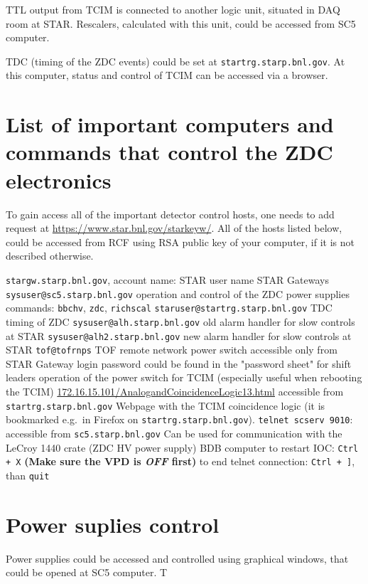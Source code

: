 TTL output from TCIM is connected to another logic unit, situated in DAQ room at STAR. Rescalers, calculated with this unit, could be accessed from SC5 computer.

TDC (timing of the ZDC events) could be set at \texttt{startrg.starp.bnl.gov}. At this computer, status and control of TCIM can be accessed via a browser.

\section{List of important computers and commands that control the ZDC electronics}

To gain access all of the important detector control hosts, one needs to add request at \url{https://www.star.bnl.gov/starkeyw/}. All of the hosts listed below, could be accessed from RCF using RSA public key of your computer, if it is not described otherwise.
\begin{outline}
 \1 \texttt{stargw.starp.bnl.gov}, account name: STAR user name
   \2 STAR Gateways
 \1 \texttt{sysuser@sc5.starp.bnl.gov} 
   \2 operation and control of the ZDC power supplies
   \2 commands: \texttt{bbchv}, \texttt{zdc}, \texttt{richscal}
 \1 \texttt{staruser@startrg.starp.bnl.gov}
   \2 TDC timing of ZDC
 \1 \texttt{sysuser@alh.starp.bnl.gov} 
   \2 old alarm handler for slow controls at STAR
 \1 \texttt{sysuser@alh2.starp.bnl.gov}
   \2 new alarm handler for slow controls at STAR
 \1 \texttt{tof@tofrnps}
   \2 TOF remote network power switch
   \2 accessible only from STAR Gateway
   \2 login password could be found in the "password sheet" for shift leaders
   \2 operation of the power switch for TCIM (especially useful when rebooting the TCIM)
 \1 \url{172.16.15.101/AnalogandCoincidenceLogic13.html}
   \2 accessible from \texttt{startrg.starp.bnl.gov}
   \2 Webpage with the TCIM coincidence logic (it is bookmarked e.g.\ in Firefox on \texttt{startrg.starp.bnl.gov}).
 \1 \texttt{telnet scserv 9010}: 
   \2 accessible  from \texttt{sc5.starp.bnl.gov}
   \2 Can be used for communication with the LeCroy 1440 crate (ZDC HV power supply)
   \2 BDB computer
   \2 to restart IOC: \texttt{Ctrl + X} \textbf{(Make sure the VPD is \textit{OFF} first)}
   \2 to end telnet connection: \texttt{Ctrl + ]}, than \texttt{quit}
\end{outline}




\section{Power suplies control}
Power supplies could be accessed and controlled using graphical windows, that could be opened at SC5 computer. T

